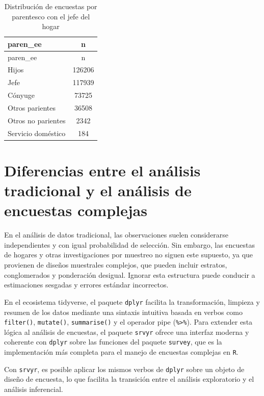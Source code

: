 \documentclass[
  spanish,
  12pt,
]{book}
\begin{document}
\begin{longtable}[]{@{}lc@{}}
\caption{\label{tab:tab-conteo-parentesco}Distribución de encuestas por parentesco con el jefe del hogar}\tabularnewline
\toprule\noalign{}
paren\_ee & n \\
\midrule\noalign{}
\endfirsthead
\toprule\noalign{}
paren\_ee & n \\
\midrule\noalign{}
\endhead
\bottomrule\noalign{}
\endlastfoot
Hijos & 126206 \\
Jefe & 117939 \\
Cónyuge & 73725 \\
Otros parientes & 36508 \\
Otros no parientes & 2342 \\
Servicio doméstico & 184 \\
\end{longtable}

\section{Diferencias entre el análisis tradicional y el análisis de encuestas complejas}\label{diferencias-entre-el-anuxe1lisis-tradicional-y-el-anuxe1lisis-de-encuestas-complejas}

En el análisis de datos tradicional, las observaciones suelen considerarse independientes y con igual probabilidad de selección. Sin embargo, las encuestas de hogares y otras investigaciones por muestreo no siguen este supuesto, ya que provienen de diseños muestrales complejos, que pueden incluir estratos, conglomerados y ponderación desigual.
Ignorar esta estructura puede conducir a estimaciones sesgadas y errores estándar incorrectos.

En el ecosistema tidyverse, el paquete \texttt{dplyr} facilita la transformación, limpieza y resumen de los datos mediante una sintaxis intuitiva basada en verbos como \texttt{filter()}, \texttt{mutate()}, \texttt{summarise()} y el operador pipe (\texttt{\%\textgreater{}\%}). Para extender esta lógica al análisis de encuestas, el paquete \texttt{srvyr} ofrece una interfaz moderna y coherente con \texttt{dplyr} sobre las funciones del paquete \texttt{survey}, que es la implementación más completa para el manejo de encuestas complejas en \texttt{R}.

Con \texttt{srvyr}, es posible aplicar los mismos verbos de \texttt{dplyr} sobre un objeto de diseño de encuesta, lo que facilita la transición entre el análisis exploratorio y el análisis inferencial.
\end{document}
